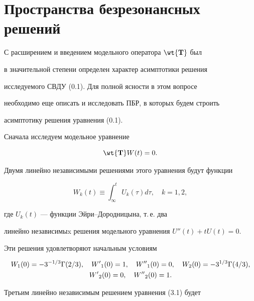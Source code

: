 \section{Пространства безрезонансных решений}





С расширением и введением модельного оператора $\wt{\bold{T}}$ был


в значительной степени определен характер асимптотики решения


исследуемого СВДУ (0.1). Для полной ясности в этом вопросе


необходимо еще описать и исследовать ПБР, в которых будем строить 


асимптотику решения уравнения (0.1).





Сначала исследуем модельное уравнение


\begin{equation}


\wt{\bold{T}} W(t) = 0. 


\end{equation}


Двумя линейно независимыми решениями этого уравнения будут функции


\begin{equation}


W_k (t) \equiv \int_{\infty}^t U_k (\tau) d \tau, \quad k=1, 2,


\end{equation}


где $U_k (t)$ --- функции Эйри--Дородницына, т.\,е. два


линейно независимыx решения модельного уравнения $U''(t) + t U(t)= 0$.


Эти решения удовлетворяют начальным условиям


\begin{gather}


W_1 (0) = - 3^{{-1}/{3}} \Gamma (2/3)


, \quad {W'}_1 (0) = 1,\quad {W''}_1 (0) = 0, \quad W_2 (0) = - 3^{{1}/{3}}


\Gamma (4/3), \notag \\


%


{W'}_2 (0) = 0, \quad {W''}_2 (0) = 1.


\end{gather}


Третьим линейно независимым решением уравнения (3.1) будет


